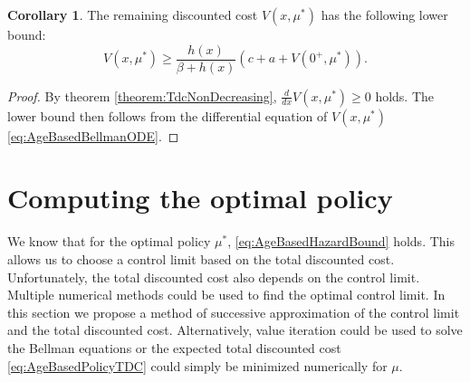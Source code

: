 \documentclass[a4paper]{thesis}
\theoremstyle{definition}
\newtheorem{corollary}{Corollary}[chapter]
\begin{document}
\begin{corollary}
	The remaining discounted cost $V(x,\mu^*)$ has the following lower bound:
	\[
	V(x,\mu^*)\geq\frac{h(x)}{\beta+ h(x)}(c+a+ V(0^+,\mu^*)).
	\]
	\begin{proof}
		By theorem \ref{theorem:TdcNonDecreasing}, $\frac{d}{dx}V(x,\mu^*)\geq 0$ holds.
		The lower bound then follows from the differential equation of $V(x,\mu^*)$ \ref{eq:AgeBasedBellmanODE}.
	\end{proof}
\end{corollary} \section{Computing the optimal policy}\label{section:AgeBasedOptimalPolicyComputation}
We know that for the optimal policy $\mu^*$, \eqref{eq:AgeBasedHazardBound} holds.
This allows us to choose a control limit based on the total discounted cost.
Unfortunately, the total discounted cost also depends on the control limit.
Multiple numerical methods could be used to find the optimal control limit.
In this section we propose a method of successive approximation of the control limit and the total discounted cost.
Alternatively, value iteration could be used to solve the Bellman equations or the expected total discounted cost \eqref{eq:AgeBasedPolicyTDC} could simply be minimized numerically for $\mu$.
\end{document}
